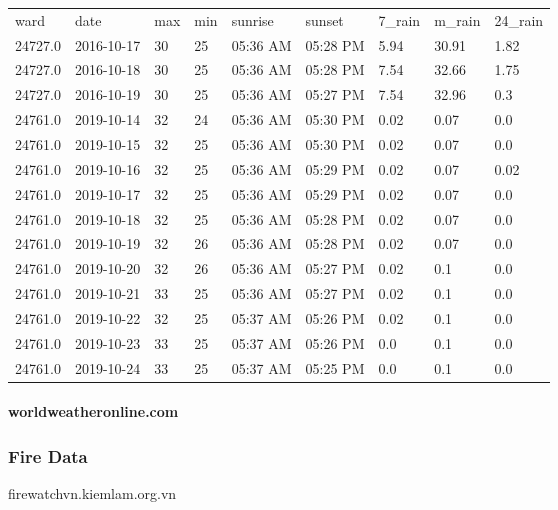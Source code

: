 \documentclass{article}
\begin{document}
\begin{table}[H]
      \begin{tabular}{lllllllll}
            ward    & date       & max & min & sunrise  & sunset   & 7\_rain & m\_rain & 24\_rain \\
            24727.0 & 2016-10-17 & 30  & 25  & 05:36 AM & 05:28 PM & 5.94    & 30.91   & 1.82     \\
            24727.0 & 2016-10-18 & 30  & 25  & 05:36 AM & 05:28 PM & 7.54    & 32.66   & 1.75     \\
            24727.0 & 2016-10-19 & 30  & 25  & 05:36 AM & 05:27 PM & 7.54    & 32.96   & 0.3      \\
            24761.0 & 2019-10-14 & 32  & 24  & 05:36 AM & 05:30 PM & 0.02    & 0.07    & 0.0      \\
            24761.0 & 2019-10-15 & 32  & 25  & 05:36 AM & 05:30 PM & 0.02    & 0.07    & 0.0      \\
            24761.0 & 2019-10-16 & 32  & 25  & 05:36 AM & 05:29 PM & 0.02    & 0.07    & 0.02     \\
            24761.0 & 2019-10-17 & 32  & 25  & 05:36 AM & 05:29 PM & 0.02    & 0.07    & 0.0      \\
            24761.0 & 2019-10-18 & 32  & 25  & 05:36 AM & 05:28 PM & 0.02    & 0.07    & 0.0      \\
            24761.0 & 2019-10-19 & 32  & 26  & 05:36 AM & 05:28 PM & 0.02    & 0.07    & 0.0      \\
            24761.0 & 2019-10-20 & 32  & 26  & 05:36 AM & 05:27 PM & 0.02    & 0.1     & 0.0      \\
            24761.0 & 2019-10-21 & 33  & 25  & 05:36 AM & 05:27 PM & 0.02    & 0.1     & 0.0      \\
            24761.0 & 2019-10-22 & 32  & 25  & 05:37 AM & 05:26 PM & 0.02    & 0.1     & 0.0      \\
            24761.0 & 2019-10-23 & 33  & 25  & 05:37 AM & 05:26 PM & 0.0     & 0.1     & 0.0      \\
            24761.0 & 2019-10-24 & 33  & 25  & 05:37 AM & 05:25 PM & 0.0     & 0.1     & 0.0
      \end{tabular}
\end{table}

\paragraph{worldweatheronline.com}

\subsubsection{Fire Data}
firewatchvn.kiemlam.org.vn
\end{document}
